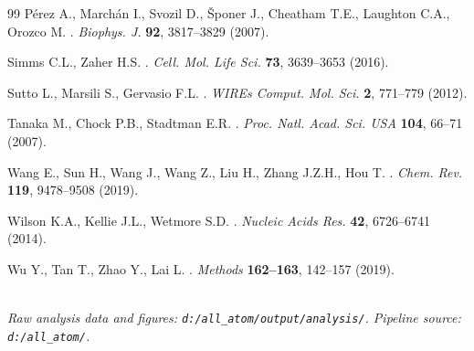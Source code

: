 \documentclass[11pt,a4paper]{article}
\begin{document}
\begin{thebibliography}{99}
P\'erez A., March\'an I., Svozil D., \v{S}poner J., Cheatham T.E.,
Laughton C.A., Orozco M.
.
\newblock \emph{Biophys. J.} \textbf{92}, 3817--3829 (2007).

Simms C.L., Zaher H.S.
.
\newblock \emph{Cell. Mol. Life Sci.} \textbf{73}, 3639--3653 (2016).

Sutto L., Marsili S., Gervasio F.L.
.
\newblock \emph{WIREs Comput. Mol. Sci.} \textbf{2}, 771--779 (2012).

Tanaka M., Chock P.B., Stadtman E.R.
.
\newblock \emph{Proc. Natl. Acad. Sci. USA} \textbf{104}, 66--71 (2007).

Wang E., Sun H., Wang J., Wang Z., Liu H., Zhang J.Z.H., Hou T.
.
\newblock \emph{Chem. Rev.} \textbf{119}, 9478--9508 (2019).

Wilson K.A., Kellie J.L., Wetmore S.D.
.
\newblock \emph{Nucleic Acids Res.} \textbf{42}, 6726--6741 (2014).

Wu Y., Tan T., Zhao Y., Lai L.
.
\newblock \emph{Methods} \textbf{162--163}, 142--157 (2019).

\end{thebibliography}

\vspace{1em}
\hrulefill\\
\textit{Raw analysis data and figures: \texttt{d:/all\_atom/output/analysis/}.
Pipeline source: \texttt{d:/all\_atom/}.}
\end{document}
